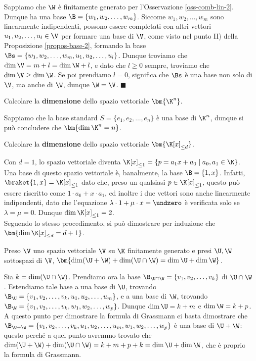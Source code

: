\documentclass[11pt, a4paper, titlepage, oneside]{scrbook}
\begin{document}
\Dimostrazione \nopagebreak

Sappiamo che $\W$ è finitamente generato per l'Osservazione \ref{oss-comb-lin-2}. Dunque ha una base \mbox{$\B = \{w_1, w_2, \ldots, w_m\}$}. Siccome $w_1, w_2, \ldots, w_m$ sono linearmente indipendenti, possono essere completati con altri vettori $u_1, u_2, \ldots, u_l \in \V$ per formare una base di $\V$, come visto nel punto II) della Proposizione \ref{propos-base-2}, formando la base $\Bs = \{w_1, w_2, \ldots, w_m, u_1, u_2, \ldots, u_l\}$. Dunque troviamo che $\dim \V = m + l = \dim \W + l$, e dato che $l \geq 0$ sempre, troviamo che $\dim \V \geq \dim \W$. Se poi prendiamo $l = 0$, significa che $\Bs$ è una base non solo di $\V$, ma anche di $\W$, dunque $\W = \V$. $\blacksquare$

\Esempi \nopagebreak

Calcolare la \textbf{dimensione} dello spazio vettoriale $\bm{\K^n}$. \nopagebreak

Sappiamo che la base standard $S = \{e_1, e_2, \ldots, e_n\}$ è una base di $\K^n$, dunque si può concludere che $\bm{\dim \K^n = n}$.

\Separatore

Calcolare la \textbf{dimensione} dello spazio vettoriale $\bm{\K[x]_{\leq d}}$. \nopagebreak

Con $d = 1$, lo spazio vettoriale diventa $\K[x]_{\leq 1} = \{p = a_1 x + a_0 \mid a_0,a_1 \in \K\}$. Una base di questo spazio vettoriale è, banalmente, la base $\B = \{1, x\}$. Infatti, $\braket{1,x} = \K[x]_{\leq 1}$ dato che, preso un qualsiasi $p \in \K[x]_{\leq 1}$, questo può essere riscritto come $1 \cdot a_0 + x \cdot a_1$, ed inoltre i due vettori sono anche linearmente indipendenti, dato che l'equazione $\lambda \cdot 1 + \mu \cdot x = \undzero$ è verificata solo se $\lambda = \mu = 0$. Dunque $\dim \K[x]_{\leq 1} = 2$. \\
Seguendo lo stesso procedimento, si può dimostrare per induzione che $\bm{\dim \K[x]_{\leq d} = d + 1}$.

\begin{Proposizione}
\label{grassmann}
Preso $\V$ uno spazio vettoriale $\V$ su $\K$ finitamente generato e presi $\U, \W$ sottospazi di $\V$, $\bm{\dim (\U + \W) + \dim (\U \cap \W) = \dim \U + \dim \W}$.
\end{Proposizione}

\Dimostrazione \nopagebreak

Sia $k = \dim (\U \cap \W)$. Prendiamo ora la base $\B_{\U \cap \W} = \{v_1, v_2, \ldots, v_k\}$ di $\U \cap \W$. Estendiamo tale base a una base di $\U$, trovando $\B_{\U} = \{v_1, v_2, \ldots, v_k, u_1, u_2, \ldots, u_m\}$, e a una base di $\W$, trovando $\B_{\W} = \{v_1, v_2, \ldots, v_k, w_1, w_2, \ldots, w_p\}$. Dunque $\dim \U = k + m$ e $\dim \W = k + p$. A questo punto per dimostrare la formula di Grassmann ci basta dimostrare che $\B_{\U + \W} = \{v_1, v_2, \ldots, v_k, u_1, u_2, \ldots, u_m, w_1, w_2, \ldots, w_p\}$ è una base di $\U + \W$: questo perché a quel punto avremmo trovato che $\dim (\U + \W) + \dim (\U \cap \W) = k + m + p + k = \dim \U + \dim \W$, che è proprio la formula di Grassmann.
\end{document}
